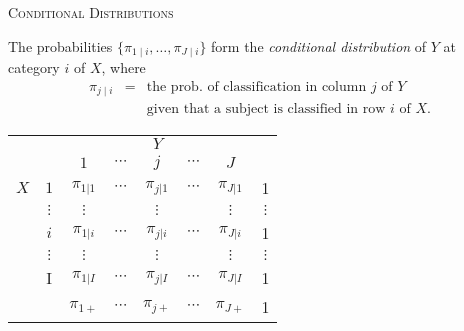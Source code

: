\documentclass[dvipdfmx, serif,handout]{beamer}
\begin{document}
\begin{frame}{\textsc{Conditional Distributions}}

\bi
\item The probabilities $\{\pi_{1 \mid i}, \ldots, \pi_{J \mid i}\}$ form the {\it conditional distribution} of $Y$ at category $i$ of $X$, where
\begin{eqnarray*}
\pi_{j \mid i} &=& \mbox{the prob. of classification in column $j$ of $Y$} \\
&& \mbox{given that a subject is classified in row $i$ of $X$.}
\end{eqnarray*}
\centering
\begin{tabular}{cc|ccccc|c}
\hline
&		&\multicolumn{5}{c|}{$Y$}  & \\
&		&{$1$}  		&	{$\cdots$}		&	{$j$} 		&	{$\cdots$} &{$J$}  & \\\hline
$X$&$1$ 		& $\pi_{1|1}$ 	&	$\cdots$ 			&	$\pi_{j|1}$ 	&	$\cdots$ 	&	$\pi_{J|1}$&  1\\
&$\vdots$  	& $\vdots$ 	&		 		 	&	$\vdots$ 	&		 	&	$\vdots$&  $\vdots$ 	 \\
&{$i$} 		& {$\pi_{1|i}$} 	&	{$\cdots$}	 	&	{$\pi_{j|i}$} 	&	{$\cdots$}	&	{$\pi_{J|i}$}&  1\\
&$\vdots$ 	& $\vdots$ 	&		 		 	&	$\vdots$ 	&		 	&	$\vdots$&  $\vdots$ 	 \\
&I 		& $\pi_{1|I}$ 	&	$\cdots$ 			&	$\pi_{j|I}$ 	&	$\cdots$ 	&	$\pi_{J|I}$&  1 \\\hline
&		& $\pi_{1+}$ 	&	$\cdots$ 			&	$\pi_{j+}$ 	&	$\cdots$ 	&	$\pi_{J+}$&  1\\
\end{tabular}

\ei

\end{frame}
\end{document}
